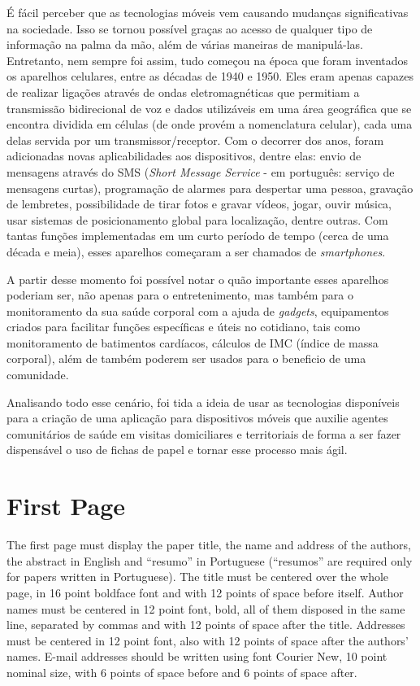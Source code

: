 \documentclass[12pt]{article}
\begin{document}
É fácil perceber que as tecnologias móveis vem causando mudanças significativas na sociedade. Isso se tornou possível graças ao acesso de qualquer tipo de informação na palma da mão, além de várias maneiras de manipulá-las. Entretanto, nem sempre foi assim, tudo começou na época que foram inventados os aparelhos celulares, entre as décadas de 1940 e 1950. Eles eram apenas capazes de realizar ligações através de ondas eletromagnéticas que permitiam a transmissão bidirecional de voz e dados utilizáveis em uma área geográfica que se encontra dividida em células (de onde provém a nomenclatura celular), cada uma delas servida por um transmissor/receptor. Com o decorrer dos anos, foram adicionadas novas aplicabilidades aos dispositivos, dentre elas: envio de mensagens através do SMS (\textit{Short Message Service} - em português: serviço de mensagens curtas), programação de alarmes para despertar uma pessoa, gravação de lembretes, possibilidade de tirar fotos e gravar vídeos,  jogar, ouvir música, usar sistemas de posicionamento global para localização, dentre outras. Com tantas funções implementadas em um curto período de tempo (cerca de uma década e meia), esses aparelhos começaram a ser chamados de \textit{smartphones}.

A partir desse momento foi possível notar o quão importante esses aparelhos poderiam ser, não apenas para o entretenimento, mas também para o monitoramento da sua saúde corporal com a ajuda de \textit{gadgets}, equipamentos criados para facilitar funções específicas e úteis no cotidiano, tais como monitoramento de batimentos cardíacos, cálculos de IMC (índice de massa corporal), além de também poderem ser usados para o beneficio de uma comunidade.

Analisando todo esse cenário, foi tida a ideia de usar as tecnologias disponíveis para a criação de uma aplicação para dispositivos móveis que auxilie agentes comunitários de saúde em visitas domiciliares e territoriais de forma a ser fazer dispensável o uso de fichas de papel e tornar esse processo mais ágil.

\section{First Page} \label{sec:firstpage}

The first page must display the paper title, the name and address of the
authors, the abstract in English and ``resumo'' in Portuguese (``resumos'' are
required only for papers written in Portuguese). The title must be centered
over the whole page, in 16 point boldface font and with 12 points of space
before itself. Author names must be centered in 12 point font, bold, all of
them disposed in the same line, separated by commas and with 12 points of
space after the title. Addresses must be centered in 12 point font, also with
12 points of space after the authors' names. E-mail addresses should be
written using font Courier New, 10 point nominal size, with 6 points of space
before and 6 points of space after.
\end{document}
